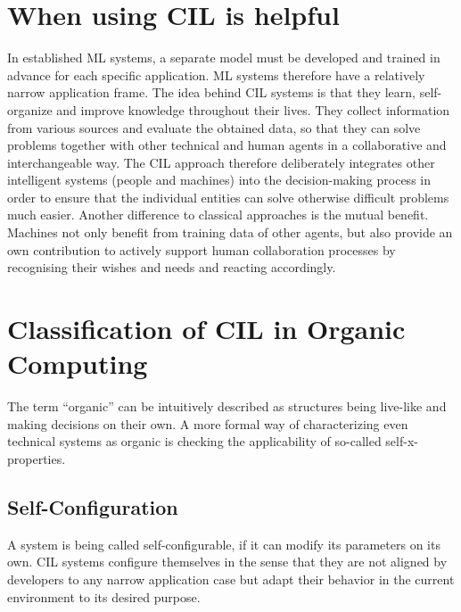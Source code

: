\documentclass[conference]{IEEEtran}
\newcommand\notes[1]{\textcolor{red}{#1}}
\begin{document}


\section{When using CIL is helpful}\label{AdvantageOfCIL}
In established ML systems, a separate model must be developed and trained in advance for 
each specific application. ML systems therefore have a relatively narrow application frame. 
The idea behind CIL systems is that they learn, self-organize and improve knowledge throughout their lives. 
They collect information from various sources and evaluate the obtained data, so that they 
can solve problems together with other technical and human agents in a 
collaborative and interchangeable way\cite{CIL:sick}.
The CIL approach therefore deliberately integrates other intelligent systems 
(people and machines) into the decision-making process in order to ensure that the individual entities 
can solve otherwise difficult problems much easier.
Another difference to classical approaches is the mutual benefit. 
Machines not only benefit from training data of other agents, but also provide 
an own contribution to actively support human collaboration processes by 
recognising their wishes and needs and reacting accordingly\cite{CIL:sick}.

\section{Classification of CIL in Organic Computing}
The term ``organic'' can be intuitively described as structures being live-like and making decisions on their own. 
A more formal way of characterizing even technical systems as organic is checking the applicability of 
so-called self-x-properties\cite{Organic:schloer}\cite{Organic:schmeck}.

\subsection{Self-Configuration}
A system is being called self-configurable, if it can modify its parameters on its own.
CIL systems configure themselves in the sense that they are not aligned by developers to any narrow application 
case but adapt their behavior in the current environment to its desired purpose.
\end{document}
